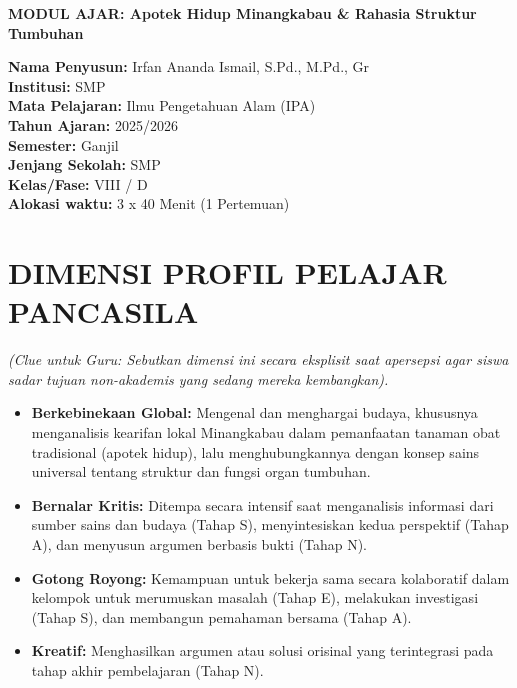 \documentclass[a4paper,12pt]{article}
\begin{document}
\begin{center}
{\Large\textbf{MODUL AJAR: Apotek Hidup Minangkabau \& Rahasia Struktur Tumbuhan}}
\end{center}

\vspace{0.5cm}

\begin{tcolorbox}[mainbox]
\textbf{Nama Penyusun:} Irfan Ananda Ismail, S.Pd., M.Pd., Gr \\
\textbf{Institusi:} SMP \\
\textbf{Mata Pelajaran:} Ilmu Pengetahuan Alam (IPA) \\
\textbf{Tahun Ajaran:} 2025/2026 \\
\textbf{Semester:} Ganjil \\
\textbf{Jenjang Sekolah:} SMP \\
\textbf{Kelas/Fase:} VIII / D \\
\textbf{Alokasi waktu:} 3 x 40 Menit (1 Pertemuan)
\end{tcolorbox}

\section{DIMENSI PROFIL PELAJAR PANCASILA}
\textit{(Clue untuk Guru: Sebutkan dimensi ini secara eksplisit saat apersepsi agar siswa sadar tujuan non-akademis yang sedang mereka kembangkan).}

\begin{itemize}
\item \textbf{Berkebinekaan Global:} Mengenal dan menghargai budaya, khususnya menganalisis kearifan lokal Minangkabau dalam pemanfaatan tanaman obat tradisional (apotek hidup), lalu menghubungkannya dengan konsep sains universal tentang struktur dan fungsi organ tumbuhan.
\item \textbf{Bernalar Kritis:} Ditempa secara intensif saat menganalisis informasi dari sumber sains dan budaya (Tahap S), menyintesiskan kedua perspektif (Tahap A), dan menyusun argumen berbasis bukti (Tahap N).
\item \textbf{Gotong Royong:} Kemampuan untuk bekerja sama secara kolaboratif dalam kelompok untuk merumuskan masalah (Tahap E), melakukan investigasi (Tahap S), dan membangun pemahaman bersama (Tahap A).
\item \textbf{Kreatif:} Menghasilkan argumen atau solusi orisinal yang terintegrasi pada tahap akhir pembelajaran (Tahap N).
\end{itemize}
\end{document}
